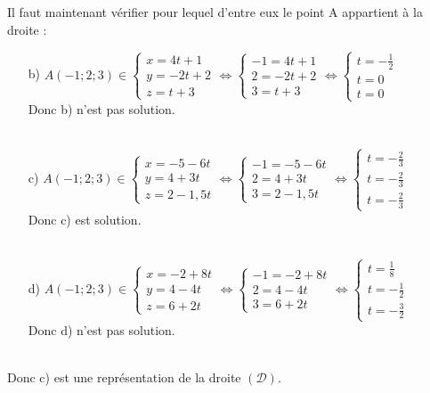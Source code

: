 \documentclass[a4paper, 12pt]{article}
\begin{document}
\noindent
Il faut maintenant vérifier pour lequel d'entre eux le point A appartient à la droite :
\vspace{3mm}
\begin{itemize}
    \item[b)] $A(-1; 2; 3) \in \begin{cases} x = 4t + 1 \\ y = -2t + 2 \\ z = t + 3 \end{cases} 
        \iff \begin{cases} -1 = 4t + 1\\ 2 = -2t + 2\\ 3 = t + 3\end{cases} 
        \iff \begin{cases} t = -\frac{1}{2} \\ t = 0 \\ t = 0\end{cases}$
        \\ Donc b) n'est pas solution. \\ \\

    \item[c)] $A(-1; 2; 3) \in \begin{cases} x = -5 - 6t \\ y = 4 + 3t \\ z = 2 - 1,5t \end{cases} 
        \iff \begin{cases} -1 = -5 -6t\\ 2 = 4 + 3t \\ 3 = 2 - 1,5t\end{cases} 
        \iff \begin{cases} t = -\frac{2}{3} \\ t = -\frac{2}{3} \\ t = - \frac{2}{3} \end{cases}$
        \\ Donc c) est solution. \\ \\

    \item[d)] $A(-1; 2; 3) \in \begin{cases} x = -2 + 8t \\ y = 4 - 4t \\ z = 6 + 2t \end{cases} 
        \iff \begin{cases} -1 = -2 +8t \\ 2 = 4 - 4t\\ 3 = 6 + 2t\end{cases} 
        \iff \begin{cases} t = \frac{1}{8} \\ t = -\frac{1}{2} \\ t = -\frac{3}{2} \end{cases}$
        \\ Donc d) n'est pas solution. \\ \\

\end{itemize}
Donc c) est une représentation de la droite $(\mathcal{D})$.
\end{document}
